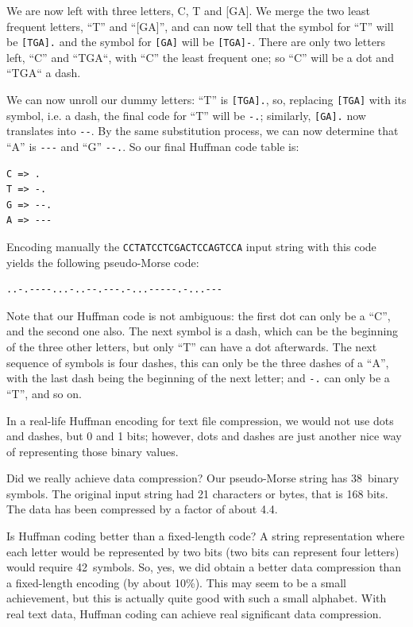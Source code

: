 We are now left with three letters, C, T and [GA]. We merge the 
two least frequent letters, ``T'' and ``[GA]'', and can now tell 
that the symbol for ``T'' will be \verb'[TGA].' and the symbol for 
\verb'[GA]' will be \verb'[TGA]-'. There are only two letters left, 
``C'' and ``TGA``, with ``C'' the least frequent one; so ``C'' will 
be a dot and ``TGA`` a dash. 

We can now unroll our dummy letters: ``T'' is \verb'[TGA].', so, 
replacing \verb'[TGA]' with its symbol, i.e. a dash, the 
final code for ``T'' will be \verb'-.'; similarly, \verb'[GA].' 
now translates into \verb'--'. By the same substitution process, 
we can now determine that ``A'' is \verb'---' and ``G'' 
\verb'--.'. So our final Huffman code table is:

\begin{verbatim}
C => .
T => -.
G => --.
A => ---
\end{verbatim}

Encoding manually the \verb'CCTATCCTCGACTCCAGTCCA' input string 
with this code yields the following pseudo-Morse code:

\begin{verbatim}
..-.----...-..--.---.-...-----.-...---
\end{verbatim}

Note that our Huffman code is not ambiguous: the first dot can 
only be a ``C'', and the second one also. The next symbol is a 
dash, which can be the beginning of the three other letters, but 
only ``T'' can have a dot afterwards. The next sequence of 
symbols is four dashes, this can only be the three dashes of a 
``A'', with the last dash being the beginning of the next letter; 
and \verb'-.' can only be a ``T'', and so on.

In a real-life Huffman encoding for text file compression, 
we would not use dots and dashes, but 0 and 1 bits; however,  
dots and dashes are just another nice way of representing 
those binary values.

Did we really achieve data compression? Our pseudo-Morse string has 
38~binary symbols. The original input string had 21 characters 
or bytes, that is 168 bits. The data has been compressed by a 
factor of about 4.4. 

Is Huffman coding better than a fixed-length code? A string 
representation where each letter would be represented by two 
bits (two bits can represent four letters) would require 
42~symbols. So, yes, we did obtain a better data compression 
than a fixed-length encoding (by about 10\%). This may seem 
to be a small achievement, but this is actually quite good with 
such a small alphabet. With real text data, Huffman coding can 
achieve real significant data compression.


